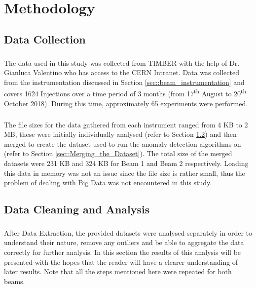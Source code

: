 \chapter{Methodology}

\section{Data Collection}
\paragraph{ }The data used in this study was collected from \ac{TIMBER} with the help of Dr. Gianluca Valentino who has access to the \acs{CERN} Intranet. Data was collected from the instrumentation discussed in Section \ref{sec::beam_instrumentation} and covers 1624 Injections over a time period of 3 months (from 17\textsuperscript{th} August to 20\textsuperscript{th} October 2018). During this time, approximately 65 experiments were performed.

\paragraph{ }The file sizes for the data gathered from each instrument ranged from 4 KB to 2 MB, these were initially individually analysed (refer to Section \ref{sec::Data_Cleaning_and_Analysis}) and then merged to create the dataset used to run the anomaly detection algorithms on (refer to Section \ref{sec::Merging_the_Dataset}). The total size of the merged datasets were 231 KB and 324 KB for Beam 1 and Beam 2 respectively. Loading this data in memory was not an issue since the file size is rather small, thus the problem of dealing with Big Data was not encountered in this study.

\section{Data Cleaning and Analysis}
\label{sec::Data_Cleaning_and_Analysis}
\paragraph{ }After Data Extraction, the provided datasets were analysed separately in order to understand their nature, remove any outliers and be able to aggregate the data correctly for further analysis. In this section the results of this analysis will be presented with the hopes that the reader will have a clearer understanding of later results. Note that all the steps mentioned here were repeated for both beams.

